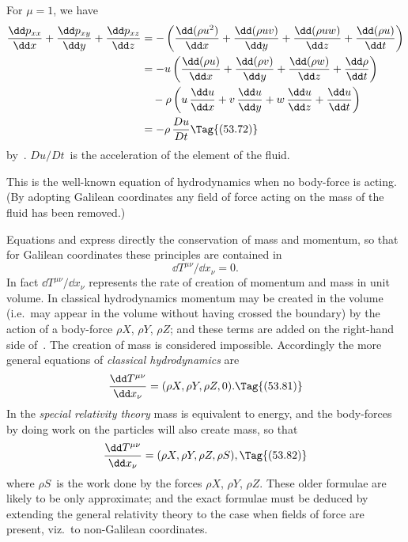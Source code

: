 \documentclass[12pt]{book}
\begin{document}
For $\mu = 1$, we have
\begin{align*}
  \frac{\dd p_{xx}}{\dd x} + \frac{\dd p_{xy}}{\dd y} + \frac{\dd p_{xz}}{\dd z}
  &= -\left(\frac{\dd(\rho u^{2})}{\dd x} + \frac{\dd(\rho u v)}{\dd y}
          + \frac{\dd(\rho u w)}{\dd z} + \frac{\dd(\rho u)}{\dd t}\right) \\
  &= -u \left(\frac{\dd(\rho u)}{\dd x} + \frac{\dd(\rho v)}{\dd y}
          + \frac{\dd(\rho w)}{\dd z} + \frac{\dd\rho}{\dd t}\right) \\
  &\quad -\rho \left(u\, \frac{\dd u}{\dd x} + v\, \frac{\dd u}{\dd y}
          + w\, \frac{\dd u}{\dd z} + \frac{\dd u}{\dd t}\right) \\
  &= -\rho\, \frac{Du}{Dt}
\Tag{(53.72)}
\end{align*}
by~. $Du/Dt$~is the acceleration of the element of the fluid.

This is the well-known equation of hydrodynamics when no body-force is
%
acting. (By adopting Galilean coordinates any field of force acting on the
mass of the fluid has been removed.)

Equations  and  express directly the conservation of mass
and momentum, so that for Galilean coordinates these principles are contained
%
in
\[
\dd T^{\mu\nu}/\dd x_{\nu} = 0.
\]
In fact $\dd T^{\mu\nu}/\dd x_{\nu}$ represents the rate of creation of momentum and mass in
unit volume. In classical hydrodynamics momentum may be created in the
volume (i.e.\ may appear in the volume without having crossed the boundary)
by the action of a body-force $\rho X$, $\rho Y$, $\rho Z$; and these terms are added on the
right-hand side of~. The creation of mass is considered impossible.
Accordingly the more general equations of \emph{classical hydrodynamics} are
\[
\frac{\dd T^{\mu\nu}}{\dd x_{\nu}} = (\rho X, \rho Y, \rho Z, 0).
\Tag{(53.81)}
\]
In the \emph{special relativity theory} mass is equivalent to energy, and the body-forces
by doing work on the particles will also create mass, so that
\[
\frac{\dd T^{\mu\nu}}{\dd x_{\nu}} = (\rho X, \rho Y, \rho Z, \rho S),
\Tag{(53.82)}
\]
where $\rho S$~is the work done by the forces $\rho X$, $\rho Y$, $\rho Z$. These older formulae
are likely to be only approximate; and the exact formulae must be deduced
by extending the general relativity theory to the case when fields of force are
present, viz.\ to non-Galilean coordinates.
\end{document}
